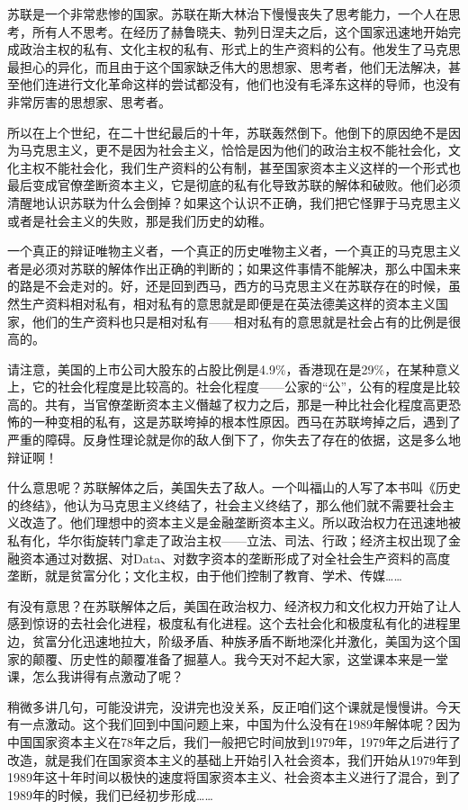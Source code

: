 \documentclass[UTF8, 12pt, a4paper]{ctexrep}
\begin{document}
苏联是一个非常悲惨的国家。苏联在斯大林治下慢慢丧失了思考能力，一个人在思考，所有人不思考。在经历了赫鲁晓夫、勃列日涅夫之后，这个国家迅速地开始完成政治主权的私有、文化主权的私有、形式上的生产资料的公有。他发生了马克思最担心的异化，而且由于这个国家缺乏伟大的思想家、思考者，他们无法解决，甚至他们连进行文化革命这样的尝试都没有，他们也没有毛泽东这样的导师，也没有非常厉害的思想家、思考者。

所以在上个世纪，在二十世纪最后的十年，苏联轰然倒下。他倒下的原因绝不是因为马克思主义，更不是因为社会主义，恰恰是因为他们的政治主权不能社会化，文化主权不能社会化，我们生产资料的公有制，甚至国家资本主义这样的一个形式也最后变成官僚垄断资本主义，它是彻底的私有化导致苏联的解体和破败。他们必须清醒地认识苏联为什么会倒掉？如果这个认识不正确，我们把它怪罪于马克思主义或者是社会主义的失败，那是我们历史的幼稚。

一个真正的辩证唯物主义者，一个真正的历史唯物主义者，一个真正的马克思主义者是必须对苏联的解体作出正确的判断的；如果这件事情不能解决，那么中国未来的路是不会走对的。好，还是回到西马，西方的马克思主义在苏联存在的时候，虽然生产资料相对私有，相对私有的意思就是即便是在英法德美这样的资本主义国家，他们的生产资料也只是相对私有——相对私有的意思就是社会占有的比例是很高的。

请注意，美国的上市公司大股东的占股比例是4.9\%，香港现在是29\%，在某种意义上，它的社会化程度是比较高的。社会化程度——公家的“公”，公有的程度是比较高的。共有，当官僚垄断资本主义僭越了权力之后，那是一种比社会化程度高更恐怖的一种变相的私有，这是苏联垮掉的根本性原因。西马在苏联垮掉之后，遇到了严重的障碍。反身性理论就是你的敌人倒下了，你失去了存在的依据，这是多么地辩证啊！

什么意思呢？苏联解体之后，美国失去了敌人。一个叫福山的人写了本书叫《历史的终结》，他认为马克思主义终结了，社会主义终结了，那么他们就不需要社会主义改造了。他们理想中的资本主义是金融垄断资本主义。所以政治权力在迅速地被私有化，华尔街旋转门拿走了政治主权——立法、司法、行政；经济主权出现了金融资本通过对数据、对Data、对数字资本的垄断形成了对全社会生产资料的高度垄断，就是贫富分化；文化主权，由于他们控制了教育、学术、传媒……

有没有意思？在苏联解体之后，美国在政治权力、经济权力和文化权力开始了让人感到惊讶的去社会化进程，极度私有化进程。这个去社会化和极度私有化的进程里边，贫富分化迅速地拉大，阶级矛盾、种族矛盾不断地深化并激化，美国为这个国家的颠覆、历史性的颠覆准备了掘墓人。我今天对不起大家，这堂课本来是一堂课，怎么我讲得有点激动了呢？

稍微多讲几句，可能没讲完，没讲完也没关系，反正咱们这个课就是慢慢讲。今天有一点激动。这个我们回到中国问题上来，中国为什么没有在1989年解体呢？因为中国国家资本主义在78年之后，我们一般把它时间放到1979年，1979年之后进行了改造，就是我们在国家资本主义的基础上开始引入社会资本，我们开始从1979年到1989年这十年时间以极快的速度将国家资本主义、社会资本主义进行了混合，到了1989年的时候，我们已经初步形成……
\end{document}
